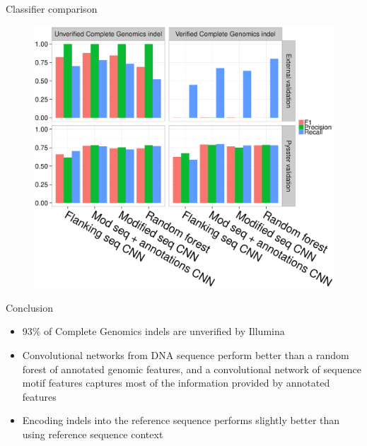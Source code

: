 \begin{column}{\onecolwid} %


\begin{block}{Classifier comparison}
\begin{figure}
\includegraphics[width=1\linewidth]{figs/eval.eps}
\end{figure}

\begin{alertblock}{Conclusion}

\begin{itemize}
\item 93\% of Complete Genomics indels are unverified by Illumina
\item Convolutional networks from DNA sequence perform better than a random forest of annotated genomic features, and a convolutional network of sequence motif features captures most of the information provided by annotated features
\item Encoding indels into the reference sequence performs slightly better than using reference sequence context
\end{itemize}

\end{alertblock}


\end{block}
\end{column}
